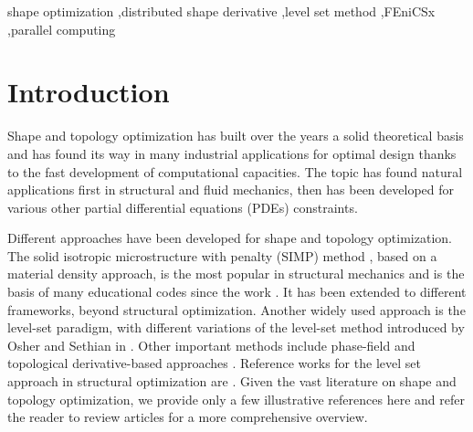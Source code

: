 \documentclass[preprint,9pt]{elsarticle}
\begin{document}
\begin{frontmatter}
\begin{keyword}
shape optimization \sep distributed shape derivative \sep level set method \sep FEniCSx \sep parallel computing


\end{keyword}

\end{frontmatter}


\section{Introduction}

Shape and topology optimization \cite{MR2731611,MR1215733} has built
over the years a solid theoretical basis and has
found its way in many industrial applications for optimal design
thanks to the fast development of computational capacities. 
The topic has found natural applications first  in structural
and fluid mechanics, then has been developed for various other
partial differential equations (PDEs) constraints. 

Different approaches have been developed for shape and topology optimization. 
The solid isotropic microstructure with penalty (SIMP) method \cite{MR2008524},
based on a material density approach,
is the most popular in structural mechanics and is the basis of
many educational codes since the work \cite{Sigmund2014}. 
It has been extended to different frameworks, beyond structural optimization.
Another widely used approach is the level-set paradigm, with different
variations of the level-set method introduced by
Osher and Sethian in \cite{MR965860}. 
Other important methods include phase-field \cite{MR2108636} and
topological derivative-based approaches \cite{MR2235384}. 
Reference works for the level set approach in structural
optimization are \cite{MR1911658,MR2033390}. 
Given the vast literature on shape and topology optimization,
we provide only a few illustrative references here and refer the
reader to review articles for a more comprehensive overview. 
\end{document}
